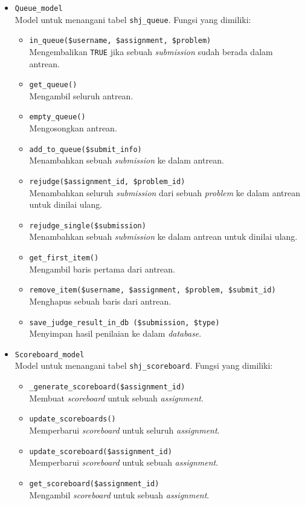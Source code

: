 \begin{itemize}
	\item \verb|Queue_model| \\ Model untuk menangani tabel \verb|shj_queue|. Fungsi yang dimiliki:
	\begin{itemize}
	    \item \verb|in_queue($username, $assignment, $problem)| \\ Mengembalikan \verb|TRUE| jika sebuah \textit{submission} sudah berada dalam antrean.
	    \item \verb|get_queue()| \\ Mengambil seluruh antrean.
	    \item \verb|empty_queue()| \\ Mengosongkan antrean.
	    \item \verb|add_to_queue($submit_info)| \\ Menambahkan sebuah \textit{submission} ke dalam antrean.
	    \item \verb|rejudge($assignment_id, $problem_id)| \\ Menambahkan seluruh \textit{submission} dari sebuah \textit{problem} ke dalam antrean untuk dinilai ulang.
	    \item \verb|rejudge_single($submission)| \\  Menambahkan sebuah \textit{submission} ke dalam antrean untuk dinilai ulang.
	    \item \verb|get_first_item()| \\ Mengambil baris pertama dari antrean.
	    \item \verb|remove_item($username, $assignment, $problem, $submit_id)| \\ Menghapus sebuah baris dari antrean.
	    \item \verb|save_judge_result_in_db ($submission, $type)| \\ Menyimpan hasil penilaian ke dalam \textit{database}.
	\end{itemize}
	
	\item \verb|Scoreboard_model| \\ Model untuk menangani tabel \verb|shj_scoreboard|. Fungsi yang dimiliki:
	\begin{itemize}
	    \item \verb|_generate_scoreboard($assignment_id)| \\ Membuat \textit{scoreboard} untuk sebuah \textit{assignment}.
	    \item \verb|update_scoreboards()| \\ Memperbarui \textit{scoreboard} untuk seluruh \textit{assignment}.
	    \item \verb|update_scoreboard($assignment_id)| \\ Memperbarui \textit{scoreboard} untuk sebuah \textit{assignment}.
	    \item \verb|get_scoreboard($assignment_id)| \\ Mengambil \textit{scoreboard} untuk sebuah \textit{assignment}.
	\end{itemize}
	

\end{itemize}
